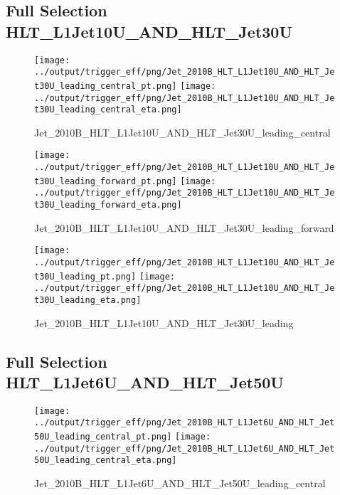 \documentclass[11pt]{article}
\begin{document}
\newpage
\subsection{Full Selection HLT\_L1Jet10U\_AND\_HLT\_Jet30U}
\begin{figure}[ht]
\centering
\texttt{[image: ../output/trigger\_eff/png/Jet\_2010B\_HLT\_L1Jet10U\_AND\_HLT\_Jet30U\_leading\_central\_pt.png]}
\texttt{[image: ../output/trigger\_eff/png/Jet\_2010B\_HLT\_L1Jet10U\_AND\_HLT\_Jet30U\_leading\_central\_eta.png]}
\caption{Jet\_2010B\_HLT\_L1Jet10U\_AND\_HLT\_Jet30U\_leading\_central}
\label{fig:jet_L1Jet10U_AND_HLT_Jet30U_leading_central}
\end{figure}

\begin{figure}[ht]
\centering
\texttt{[image: ../output/trigger\_eff/png/Jet\_2010B\_HLT\_L1Jet10U\_AND\_HLT\_Jet30U\_leading\_forward\_pt.png]}
\texttt{[image: ../output/trigger\_eff/png/Jet\_2010B\_HLT\_L1Jet10U\_AND\_HLT\_Jet30U\_leading\_forward\_eta.png]}
\caption{Jet\_2010B\_HLT\_L1Jet10U\_AND\_HLT\_Jet30U\_leading\_forward}
\label{fig:jet_L1Jet10U_AND_HLT_Jet30U_leading_forward}
\end{figure}

\begin{figure}[ht]
\centering
\texttt{[image: ../output/trigger\_eff/png/Jet\_2010B\_HLT\_L1Jet10U\_AND\_HLT\_Jet30U\_leading\_pt.png]}
\texttt{[image: ../output/trigger\_eff/png/Jet\_2010B\_HLT\_L1Jet10U\_AND\_HLT\_Jet30U\_leading\_eta.png]}
\caption{Jet\_2010B\_HLT\_L1Jet10U\_AND\_HLT\_Jet30U\_leading}
\label{fig:jet_L1Jet10U_AND_HLT_Jet30U_leading}
\end{figure}


\newpage
\subsection{Full Selection HLT\_L1Jet6U\_AND\_HLT\_Jet50U}
\begin{figure}[ht]
\centering
\texttt{[image: ../output/trigger\_eff/png/Jet\_2010B\_HLT\_L1Jet6U\_AND\_HLT\_Jet50U\_leading\_central\_pt.png]}
\texttt{[image: ../output/trigger\_eff/png/Jet\_2010B\_HLT\_L1Jet6U\_AND\_HLT\_Jet50U\_leading\_central\_eta.png]}
\caption{Jet\_2010B\_HLT\_L1Jet6U\_AND\_HLT\_Jet50U\_leading\_central}
\label{fig:jet_L1Jet6U_AND_HLT_Jet50U_leading_central}
\end{figure}
\end{document}
